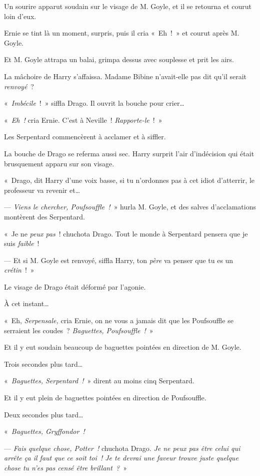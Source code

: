 Un sourire apparut soudain sur le visage de M. Goyle, et il se retourna et courut loin d'eux.

Ernie se tint là un moment, surpris, puis il cria «~Eh~!~» et courut après M. Goyle.

Et M. Goyle attrapa un balai, grimpa dessus avec souplesse et prit les airs.

La mâchoire de Harry s'affaissa. Madame Bibine n'avait-elle pas dit qu'il serait \emph{renvoyé}~?

«~\emph{Imbécile}~!~» siffla Drago. Il ouvrit la bouche pour crier…

«~\emph{Eh~!} cria Ernie. C'est à Neville~! \emph{Rapporte-le}~!~»

Les Serpentard commencèrent à acclamer et à siffler.

La bouche de Drago se referma aussi sec. Harry surprit l'air d'indécision qui était brusquement apparu sur son visage.

«~Drago, dit Harry d'une voix basse, si tu n'ordonnes pas à cet idiot d'atterrir, le professeur va revenir et…

--- \emph{Viens le chercher, Poufsouffle~!}~» hurla M. Goyle, et des salves d'acclamations montèrent des Serpentard.

«~Je ne \emph{peux pas}~! chuchota Drago. Tout le monde à Serpentard pensera que je suis \emph{faible}~!

--- Et si M. Goyle est renvoyé, siffla Harry, ton \emph{père} va penser que tu es un \emph{crétin}~!~»

Le visage de Drago était déformé par l'agonie.

À cet instant…

«~Eh, \emph{Serpensale,} cria Ernie, on ne vous a jamais dit que les Poufsouffle se serraient les coudes~? \emph{Baguettes, Poufsouffle~!}~»

Et il y eut soudain beaucoup de baguettes pointées en direction de M. Goyle.

Trois secondes plus tard…

«~\emph{Baguettes, Serpentard~!}~» dirent au moins cinq Serpentard.

Et il y eut plein de baguettes pointées en direction de Poufsouffle.

Deux secondes plus tard…

«~\emph{Baguettes, Gryffondor~!}

--- \emph{Fais quelque chose, Potter~!} chuchota Drago. \emph{Je ne peux pas être celui qui arrête ça il faut que ce soit toi~! Je te devrai une faveur trouve juste quelque chose tu n'es pas censé être brillant~?}~»

